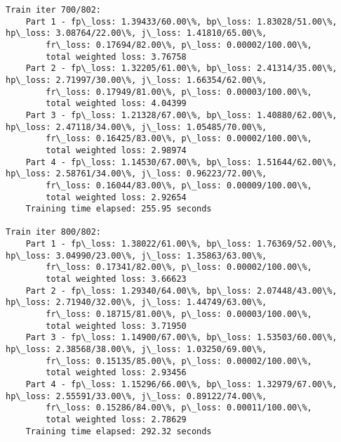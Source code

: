 \documentclass[11pt]{article}
\begin{document}
\begin{Verbatim}[commandchars=\\\{\}]
Train iter 700/802:
	Part 1 - fp\_loss: 1.39433/60.00\%, bp\_loss: 1.83028/51.00\%, hp\_loss: 3.08764/22.00\%, j\_loss: 1.41810/65.00\%, 
		fr\_loss: 0.17694/82.00\%, p\_loss: 0.00002/100.00\%, 
		total weighted loss: 3.76758
	Part 2 - fp\_loss: 1.32205/61.00\%, bp\_loss: 2.41314/35.00\%, hp\_loss: 2.71997/30.00\%, j\_loss: 1.66354/62.00\%, 
		fr\_loss: 0.17949/81.00\%, p\_loss: 0.00003/100.00\%, 
		total weighted loss: 4.04399
	Part 3 - fp\_loss: 1.21328/67.00\%, bp\_loss: 1.40880/62.00\%, hp\_loss: 2.47118/34.00\%, j\_loss: 1.05485/70.00\%, 
		fr\_loss: 0.16425/83.00\%, p\_loss: 0.00002/100.00\%, 
		total weighted loss: 2.98974
	Part 4 - fp\_loss: 1.14530/67.00\%, bp\_loss: 1.51644/62.00\%, hp\_loss: 2.58761/34.00\%, j\_loss: 0.96223/72.00\%, 
		fr\_loss: 0.16044/83.00\%, p\_loss: 0.00009/100.00\%, 
		total weighted loss: 2.92654
	Training time elapsed: 255.95 seconds

Train iter 800/802:
	Part 1 - fp\_loss: 1.38022/61.00\%, bp\_loss: 1.76369/52.00\%, hp\_loss: 3.04990/23.00\%, j\_loss: 1.35863/63.00\%, 
		fr\_loss: 0.17341/82.00\%, p\_loss: 0.00002/100.00\%, 
		total weighted loss: 3.66623
	Part 2 - fp\_loss: 1.29340/64.00\%, bp\_loss: 2.07448/43.00\%, hp\_loss: 2.71940/32.00\%, j\_loss: 1.44749/63.00\%, 
		fr\_loss: 0.18715/81.00\%, p\_loss: 0.00003/100.00\%, 
		total weighted loss: 3.71950
	Part 3 - fp\_loss: 1.14900/67.00\%, bp\_loss: 1.53503/60.00\%, hp\_loss: 2.38568/38.00\%, j\_loss: 1.03250/69.00\%, 
		fr\_loss: 0.15135/85.00\%, p\_loss: 0.00002/100.00\%, 
		total weighted loss: 2.93456
	Part 4 - fp\_loss: 1.15296/66.00\%, bp\_loss: 1.32979/67.00\%, hp\_loss: 2.55591/33.00\%, j\_loss: 0.89122/74.00\%, 
		fr\_loss: 0.15286/84.00\%, p\_loss: 0.00011/100.00\%, 
		total weighted loss: 2.78629
	Training time elapsed: 292.32 seconds


\end{Verbatim}
\end{document}
